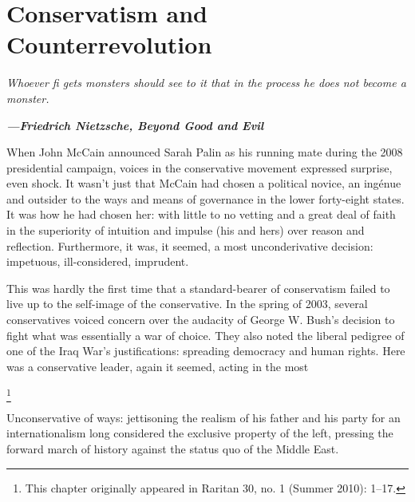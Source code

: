 \chapter{Conservatism and Counterrevolution}\label{Conservatism and Counterrevolution}
 \par 
\textit{Whoever ﬁ gets monsters should see to it that in the process he does not become a monster.}
 \par 
\textbf{\textit{—Friedrich Nietzsche, Beyond Good and Evil} }
 \par 
When John McCain announced Sarah Palin as his running mate during the 2008 presidential campaign, voices in the conservative movement expressed surprise, even shock. It wasn’t just that McCain had chosen a political novice, an ingénue and outsider to the ways and means of governance in the lower forty-eight states. It was how he had chosen her: with little to no vetting and a great deal of faith in the superiority of intuition and impulse (his and hers) over reason and reflection. Furthermore, it was, it seemed, a most unconderivative decision: impetuous, ill-considered, imprudent.
 \par 
This was hardly the first time that a standard-bearer of conservatism failed to live up to the self-image of the conservative. In the spring of 2003, several conservatives voiced concern over the audacity of George W. Bush’s decision to fight what was essentially a war of choice. They also noted the liberal pedigree of one of the Iraq War’s justifications: spreading democracy and human rights. Here was a conservative leader, again it seemed, acting in the most
 \par 
\footnote{This chapter originally appeared in Raritan 30, no. 1 (Summer 2010): 1–17.}
 \par 
Unconservative of ways: jettisoning the realism of his father and his party for an internationalism long considered the exclusive property of the left, pressing the forward march of history against the status quo of the Middle East.
 \par 
